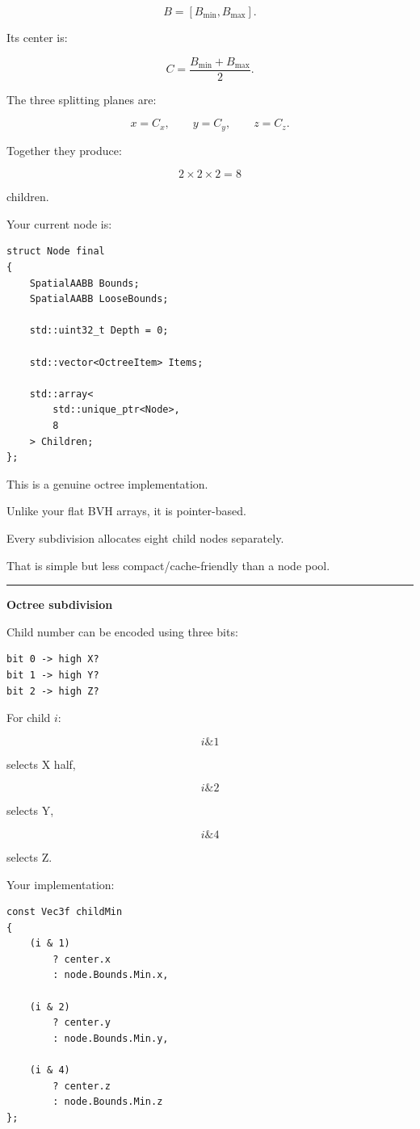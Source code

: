 \[
B=[B_{\min},B_{\max}].
\]

Its center is:

\[
C=\frac{B_{\min}+B_{\max}}2.
\]

The three splitting planes are:

\[
x=C_x,\qquad
y=C_y,\qquad
z=C_z.
\]

Together they produce:

\[
2\times2\times2=8
\]

children.

Your current node is:

\begin{verbatim}
struct Node final
{
    SpatialAABB Bounds;
    SpatialAABB LooseBounds;

    std::uint32_t Depth = 0;

    std::vector<OctreeItem> Items;

    std::array<
        std::unique_ptr<Node>,
        8
    > Children;
};
\end{verbatim}

This is a genuine octree implementation.

Unlike your flat BVH arrays, it is pointer-based.

Every subdivision allocates eight child nodes separately.

That is simple but less compact/cache-friendly than a node pool.

\begin{center}\rule{0.5\linewidth}{0.5pt}\end{center}

\textbf{Octree subdivision}

Child number can be encoded using three bits:

\begin{verbatim}
bit 0 -> high X?
bit 1 -> high Y?
bit 2 -> high Z?
\end{verbatim}

For child \(i\):

\[
i\&1
\]

selects X half,

\[
i\&2
\]

selects Y,

\[
i\&4
\]

selects Z.

Your implementation:

\begin{verbatim}
const Vec3f childMin
{
    (i & 1)
        ? center.x
        : node.Bounds.Min.x,

    (i & 2)
        ? center.y
        : node.Bounds.Min.y,

    (i & 4)
        ? center.z
        : node.Bounds.Min.z
};
\end{verbatim}

